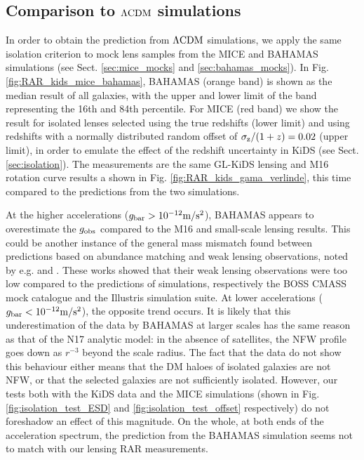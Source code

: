 \documentclass[usenatbib]{mnras}
\newcommand{\hMpc}{\, h^{-1}{\rm{Mpc}} }
\newcommand{\mpss}{ {\rm m/s^2} }
\newcommand{\lcdm}{{\rm \Lambda CDM}}
\newcommand{\un}[1]{_{\rm #1}}
\begin{document}
\subsection{Comparison to $\lcdm$ simulations}
\label{sec:results-simulations}

In order to obtain the prediction from $\lcdm$ simulations, we apply the same isolation criterion to mock lens samples from the MICE and BAHAMAS simulations (see Sect. \ref{sec:mice_mocks} and \ref{sec:bahamas_mocks}). In Fig. \ref{fig:RAR_kids_mice_bahamas}, BAHAMAS (orange band) is shown as the median result of all galaxies, with the upper and lower limit of the band representing the 16th and 84th percentile. For MICE (red band) we show the result for isolated lenses selected using the true redshifts (lower limit) and using redshifts with a normally distributed random offset of $\sigma\un{z}/(1+z) = 0.02$ (upper limit), in order to emulate the effect of the redshift uncertainty in KiDS (see Sect. \ref{sec:isolation}). The measurements are the same GL-KiDS lensing and M16 rotation curve results a shown in Fig. \ref{fig:RAR_kids_gama_verlinde}, this time compared to the predictions from the two simulations.

At the higher accelerations ($g\un{bar}>10^{-12} \mpss$), BAHAMAS appears to overestimate the $g\un{obs}$ compared to the M16 and small-scale lensing results. This could be another instance of the general mass mismatch found between predictions based on abundance matching and weak lensing observations, noted by e.g. \cite{leauthaud2017} and \cite{svensmark2019}. These works showed that their weak lensing observations were too low compared to the predictions of simulations, respectively the BOSS CMASS mock catalogue and the Illustris simulation suite. At lower accelerations ($g\un{bar}<10^{-12} \mpss$), the opposite trend occurs. It is likely that this underestimation of the data by BAHAMAS at larger scales has the same reason as that of the N17 analytic model: in the absence of satellites, the NFW profile goes down as $r^{-3}$ beyond the scale radius. The fact that the data do not show this behaviour either means that the DM haloes of isolated galaxies are not NFW, or that the selected galaxies are not sufficiently isolated. However, our tests both with the KiDS data and the MICE simulations (shown in Fig. \ref{fig:isolation_test_ESD} and \ref{fig:isolation_test_offset} respectively) do not foreshadow an effect of this magnitude. On the whole, at both ends of the acceleration spectrum, the prediction from the BAHAMAS simulation seems not to match with our lensing RAR measurements.
\end{document}
